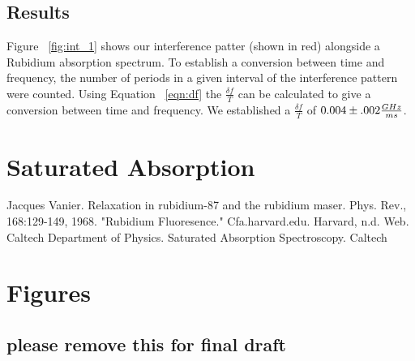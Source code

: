 \documentclass[paper=a4, fontsize=11pt]{scrartcl} %
\numberwithin{equation}{section}
\numberwithin{figure}{section}
\numberwithin{table}{section}
\begin{document}
\subsection{Results}


Figure ~\ref{fig:int_1} shows our interference patter (shown in red)
alongside a Rubidium absorption spectrum. To establish a conversion
between time and frequency, the number of periods in a given interval of
the interference pattern were counted. Using Equation ~\ref{eqn:df}
the $\frac{\delta f}{T}$ can be calculated to give a conversion
between time and frequency. We established a $\frac{\delta f}{T}$ of
$0.004 \pm .002\frac{\normalfont{GHz}}{\normalfont{ms}}$.  
\section{Saturated Absorption}




\begin{thebibliography}{99}
Jacques Vanier. Relaxation in rubidium-87 and the
  rubidium maser. Phys. Rev., 168:129-149, 1968.
"Rubidium Fluoresence." Cfa.harvard.edu. Harvard,
  n.d. Web.
Caltech Department of Physics. Saturated Absorption
Spectroscopy. Caltech
\end{thebibliography}



\section{Figures}

\subsection{please remove this for final draft}


\end{document}
